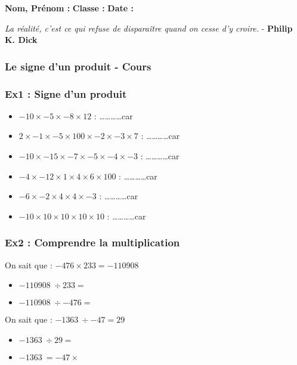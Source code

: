 \newpage

\textbf{Nom, Prénom :} \hspace{8cm} \textbf{Classe :} \hspace{3cm} \textbf{Date :}\\

\begin{center}
  \textit{La réalité, c'est ce qui refuse de disparaître quand on cesse d'y croire.}  - \textbf{Philip K. Dick}
\end{center}

\subsubsection*{Le signe d'un produit - Cours}

\Pointilles[5]

\subsubsection*{Ex1 : Signe d'un produit}

\begin{itemize}[label={$\bullet$}]
  \item $-10 \times -5 \times -8 \times 12 $  : \ldots\ldots\ldots\ldots car \dotfill 
  \item $2 \times -1 \times -5 \times 100 \times -2 \times -3 \times 7$ : \ldots\ldots\ldots\ldots car \dotfill
  \item $-10 \times -15 \times -7 \times -5 \times -4 \times -3$ : \ldots\ldots\ldots\ldots car \dotfill
  \item $-4 \times -12 \times 1 \times 4 \times 6 \times 100 $ : \ldots\ldots\ldots\ldots car \dotfill
  \item $-6 \times -2 \times 4 \times 4 \times -3 $ : \ldots\ldots\ldots\ldots car \dotfill
  \item $-10 \times 10 \times 10 \times 10 \times 10 $  : \ldots\ldots\ldots\ldots car \dotfill
\end{itemize}

\subsubsection*{Ex2 : Comprendre la multiplication}

\begin{multicols}{2}

On sait que : $-476 \times 233 = \SI{-110 908}{}$
\begin{itemize}[label={$\bullet$}]
  \item $\SI{-110 908}{} \div 233 =$ \dotfill
  \item $\SI{-110 908}{} \div -476 = $ \dotfill
\end{itemize}

On sait que : $\SI{-1 363}{} \div -47 = 29$
\begin{itemize}[label={$\bullet$}]
  \item $\SI{-1 363}{} \div 29 =$ \dotfill
  \item $\SI{-1 363}{} = -47 \times $ \dotfill
\end{itemize}

\end{multicols}

